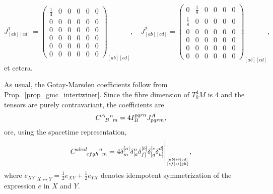 \begin{equation}
  J_{[ab][cd]}^1 = \begin{pmatrix} \frac{1}{4} & 0 & 0 & 0 & 0 & 0 \\ 0 & 0 & 0 & 0 & 0 & 0 \\ 0 & 0 & 0 & 0 & 0 & 0 \\ 0 & 0 & 0 & 0 & 0 & 0 \\ 0 & 0 & 0 & 0 & 0 & 0 \\ 0 & 0 & 0 & 0 & 0 & 0 \end{pmatrix}_{[ab][cd]},\quad
  J_{[ab][cd]}^2 = \begin{pmatrix} 0 & \frac{1}{8} & 0 & 0 & 0 & 0 \\ \frac{1}{8} & 0 & 0 & 0 & 0 & 0 \\ 0 & 0 & 0 & 0 & 0 & 0 \\ 0 & 0 & 0 & 0 & 0 & 0 \\ 0 & 0 & 0 & 0 & 0 & 0 \\ 0 & 0 & 0 & 0 & 0 & 0 \end{pmatrix}_{[ab][cd]},
\end{equation}
et cetera.

As usual, the Gotay-Marsden coefficients follow from Prop.~\ref{prop_gmc_intertwiner}. Since the fibre dimension of $T^4_0M$ is 4 and the tensors are purely contravariant, the coefficients are
\begin{equation}
  \gmc{A}{B}{n}{m} = 4 I^{pqrn}_B J^A_{pqrm},
\end{equation}
ore, using the spacetime representation,
\begin{equation}
\gmc{abcd}{efgh}{n}{m} = 4 \delta^{[a\mid}_{\vphantom{f}m} \delta^{n}_{[e} \delta^{\mid b]}_{f]} \delta^{[c}_{[g} \delta^{d]}_{h]} \Bigg\rvert_{[ab] \leftrightarrow [cd]\atop [ef] \leftrightarrow [gh]},
\end{equation}
where $e_{XY} \big\rvert_{X \leftrightarrow Y} = \frac{1}{2} e_{XY} + \frac{1}{2} e_{YX}$ denotes idempotent symmetrization of the expression $e$ in $X$ and $Y$.

